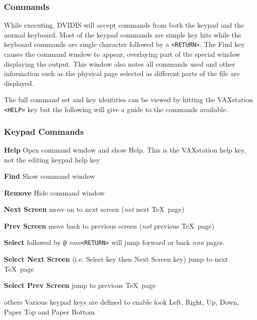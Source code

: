\subsubsection{Commands}

While executing, DVIDIS will accept commands from both the keypad and the
normal keyboard.
Most of the keypad commands are simple key hits while
the keyboard commands are single character followed by a {\tt<RETURN>}.
The Find key causes the command window to appear, overlaying part of the
special window displaying the output.
This window also notes all commands
used and other information such as the physical page selected as
different parts of the file are displayed.

The full command set and key identities can be viewed by hitting the VAXstation
{\tt<HELP>} key but the following will give a guide to the commands available.

\subsubsection{Keypad Commands}

\begin{list}%
{}%
{\settowidth{\labelwidth}{\bf Select Prev Screen x}
\settowidth{\labelsep}{aaaa}
\settowidth{\rightmargin}{aaaaaaaaaa}
\addtolength{\labelwidth}{\labelsep}
\addtolength{\labelwidth}{\labelsep}
\setlength{\leftmargin}{\labelwidth}}
%
\item [{\bf Help}] Open command window and show Help.
This is the VAXstation help key, not the editing keypad help key
\item [{\bf Find}] Show command window
\item [{\bf Remove}] Hide command window
\item [{\bf Next Screen}] move on to next screen ({\em not} next \TeX\ page)
\item [{\bf Prev Screen}] move back to previous screen ({\em not} previous 
 \TeX\ page)
\item [{\bf Select}] followed by {\tt\verb@{+-}@} {\it nnn}{\tt<RETURN>}
will jump forward or back {\it nnn} pages.
\item [{\bf Select Next Screen}] (i.e. Select key then Next Screen key) jump
 to next \TeX\ page
\item [{\bf Select Prev Screen}] jump to previous \TeX\ page
\item [others] Various keypad keys are defined to enable look Left, Right, Up,
Down, Paper Top and Paper Bottom
\end{list}

